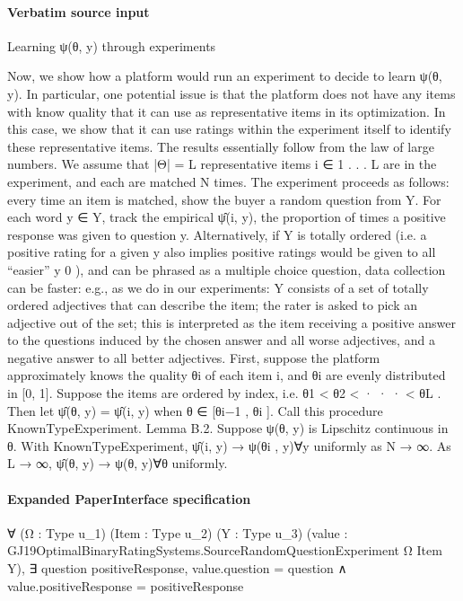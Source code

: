 \documentclass[10pt]{article}
\begin{document}
\paragraph{Verbatim source input}
\begin{ReviewVerbatim}
Learning ψ(θ, y) through experiments

Now, we show how a platform would run an experiment to decide to learn ψ(θ, y). In particular,
one potential issue is that the platform does not have any items with know quality that it can use
as representative items in its optimization. In this case, we show that it can use ratings within the
experiment itself to identify these representative items. The results essentially follow from the law
of large numbers.
We assume that |Θ| = L representative items i ∈ {1 . . . L} are in the experiment, and each are
matched N times. The experiment proceeds as follows: every time an item is matched, show the
buyer a random question from Y. For each word y ∈ Y, track the empirical ψ̂(i, y), the proportion
of times a positive response was given to question y. Alternatively, if Y is totally ordered (i.e. a
positive rating for a given y also implies positive ratings would be given to all “easier” y 0 ), and
can be phrased as a multiple choice question, data collection can be faster: e.g., as we do in our
experiments: Y consists of a set of totally ordered adjectives that can describe the item; the rater is
asked to pick an adjective out of the set; this is interpreted as the item receiving a positive answer
to the questions induced by the chosen answer and all worse adjectives, and a negative answer to
all better adjectives.
First, suppose the platform approximately knows the quality θi of each item i, and θi are evenly
distributed in [0, 1]. Suppose the items are ordered by index, i.e. θ1 < θ2 < · · · < θL . Then let
ψ̂(θ, y) = ψ̂(i, y) when θ ∈ [θi−1 , θi ]. Call this procedure KnownTypeExperiment.
Lemma B.2. Suppose ψ(θ, y) is Lipschitz continuous in θ. With KnownTypeExperiment, ψ̂(i, y) →
ψ(θi , y)∀y uniformly as N → ∞. As L → ∞, ψ̂(θ, y) → ψ(θ, y)∀θ uniformly.
\end{ReviewVerbatim}


\paragraph{Expanded PaperInterface specification}
\begin{ReviewVerbatim}
∀ (Ω : Type u_1) (Item : Type u_2) (Y : Type u_3)
  (value : GJ19OptimalBinaryRatingSystems.SourceRandomQuestionExperiment Ω Item Y),
  ∃ question positiveResponse, value.question = question ∧ value.positiveResponse = positiveResponse
\end{ReviewVerbatim}
\end{document}
